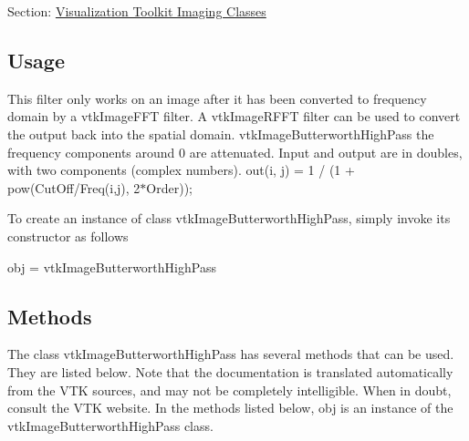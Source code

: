 Section\-: \hyperlink{sec_vtkimaging}{Visualization Toolkit Imaging Classes} \hypertarget{vtkwidgets_vtkxyplotwidget_Usage}{}\subsection{Usage}\label{vtkwidgets_vtkxyplotwidget_Usage}
This filter only works on an image after it has been converted to frequency domain by a vtk\-Image\-F\-F\-T filter. A vtk\-Image\-R\-F\-F\-T filter can be used to convert the output back into the spatial domain. vtk\-Image\-Butterworth\-High\-Pass the frequency components around 0 are attenuated. Input and output are in doubles, with two components (complex numbers). out(i, j) = 1 / (1 + pow(Cut\-Off/\-Freq(i,j), 2$\ast$\-Order));

To create an instance of class vtk\-Image\-Butterworth\-High\-Pass, simply invoke its constructor as follows \begin{DoxyVerb}  obj = vtkImageButterworthHighPass
\end{DoxyVerb}
 \hypertarget{vtkwidgets_vtkxyplotwidget_Methods}{}\subsection{Methods}\label{vtkwidgets_vtkxyplotwidget_Methods}
The class vtk\-Image\-Butterworth\-High\-Pass has several methods that can be used. They are listed below. Note that the documentation is translated automatically from the V\-T\-K sources, and may not be completely intelligible. When in doubt, consult the V\-T\-K website. In the methods listed below, {\ttfamily obj} is an instance of the vtk\-Image\-Butterworth\-High\-Pass class. 

